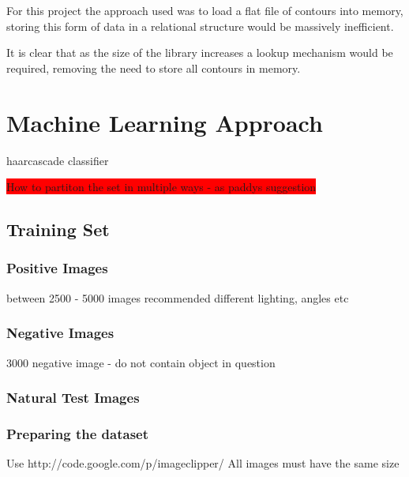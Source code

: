 For this project the approach used was to load a flat file of contours into memory, storing this form of data in a relational structure would be massively inefficient.

It is clear that as the size of the library increases a lookup mechanism would be required, removing the need to store all contours in memory.



\section{Machine Learning Approach}
haarcascade classifier

\colorbox{red}{How to partiton the set in multiple ways - as paddys suggestion}

\subsection{Training Set}

\subsubsection{Positive Images}
between 2500 - 5000 images recommended
different lighting, angles etc

\subsubsection{Negative Images}
3000 negative image - do not contain object in question

\subsubsection{Natural Test Images}

\subsubsection{Preparing the dataset}
Use http://code.google.com/p/imageclipper/ 
All images must have the same size
